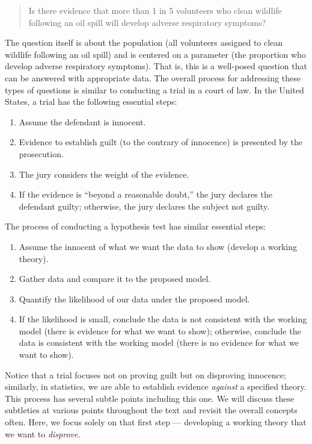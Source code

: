 \documentclass[]{book}
\providecommand{\tightlist}{%
  \setlength{\itemsep}{0pt}\setlength{\parskip}{0pt}}
\theoremstyle{definition}
\theoremstyle{definition}
\theoremstyle{definition}
\theoremstyle{remark}
\begin{document}
\begin{quote}
Is there evidence that more than 1 in 5 volunteers who clean wildlife
following an oil spill will develop adverse respiratory symptoms?
\end{quote}

The question itself is about the population (all volunteers assigned to
clean wildlife following an oil spill) and is centered on a parameter
(the proportion who develop adverse respiratory symptoms). That is, this
is a well-posed question that can be answered with appropriate data. The
overall process for addressing these types of questions is similar to
conducting a trial in a court of law. In the United States, a trial has
the following essential steps:

\begin{enumerate}
\def\labelenumi{\arabic{enumi}.}
\tightlist
\item
  Assume the defendant is innocent.
\item
  Evidence to establish guilt (to the contrary of innocence) is
  presented by the prosecution.
\item
  The jury considers the weight of the evidence.
\item
  If the evidence is ``beyond a reasonable doubt,'' the jury declares
  the defendant guilty; otherwise, the jury declares the subject not
  guilty.
\end{enumerate}

The process of conducting a hypothesis test has similar essential steps:

\begin{enumerate}
\def\labelenumi{\arabic{enumi}.}
\tightlist
\item
  Assume the innocent of what we want the data to show (develop a
  working theory).
\item
  Gather data and compare it to the proposed model.
\item
  Quantify the likelihood of our data under the proposed model.
\item
  If the likelihood is small, conclude the data is not consistent with
  the working model (there is evidence for what we want to show);
  otherwise, conclude the data is consistent with the working model
  (there is no evidence for what we want to show).
\end{enumerate}

Notice that a trial focuses not on proving guilt but on disproving
innocence; similarly, in statistics, we are able to establish evidence
\emph{against} a specified theory. This process has several subtle
points including this one. We will discuss these subtleties at various
points throughout the text and revisit the overall concepts often. Here,
we focus solely on that first step --- developing a working theory that
we want to \emph{disprove}.
\end{document}
